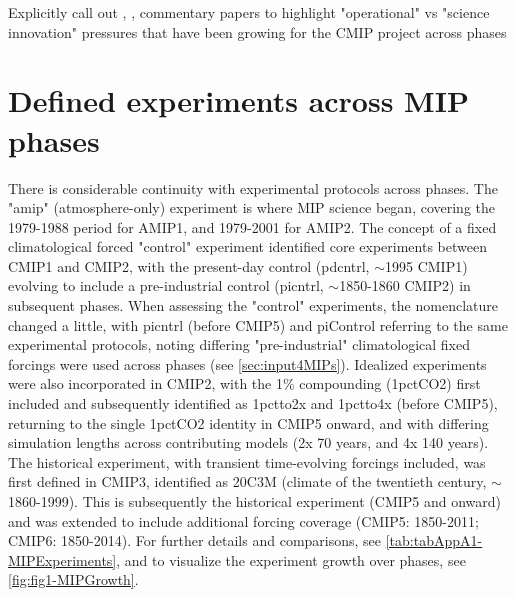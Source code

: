 \documentclass[gmd, preprint]{copernicus}
\def\cred#1{{\color{red}#1}}
\begin{document}
\cred{Explicitly call out \citet{shukla_strategies_2009,shukla_toward_2010}, \citep{jakob_need_2023}, \citep{stevens_perspective_2024} commentary papers to highlight "operational" vs "science innovation" pressures that have been growing for the CMIP project across phases}








\appendix
\section{Defined experiments across MIP phases}    %
\label{sec:secAppA1-MIPExperiments}
There is considerable continuity with experimental protocols across phases. The "amip" (atmosphere-only) experiment is where MIP science began, covering the 1979-1988 period for AMIP1, and 1979-2001 for AMIP2. The concept of a fixed climatological forced "control" experiment identified core experiments between CMIP1 and CMIP2, with the present-day control (pdcntrl, $\sim$1995 CMIP1) evolving to include a pre-industrial control (picntrl, $\sim$1850-1860 CMIP2) in subsequent phases. When assessing the "control" experiments, the nomenclature changed a little, with picntrl (before CMIP5) and piControl referring to the same experimental protocols, noting differing "pre-industrial" climatological fixed forcings were used across phases (see \autoref{sec:input4MIPs}). Idealized experiments were also incorporated in CMIP2, with the 1\% compounding (1pctCO2) first included and subsequently identified as 1pctto2x and 1pctto4x (before CMIP5), returning to the single 1pctCO2 identity in CMIP5 onward, and with differing simulation lengths across contributing models (2x 70 years, and 4x 140 years). The historical experiment, with transient time-evolving forcings included, was first defined in CMIP3, identified as 20C3M (climate of the twentieth century, $\sim$1860-1999). This is subsequently the historical experiment (CMIP5 and onward) and was extended to include additional forcing coverage (CMIP5: 1850-2011; CMIP6: 1850-2014). For further details and comparisons, see \autoref{tab:tabAppA1-MIPExperiments}, and to visualize the experiment growth over phases, see \autoref{fig:fig1-MIPGrowth}.
\end{document}
